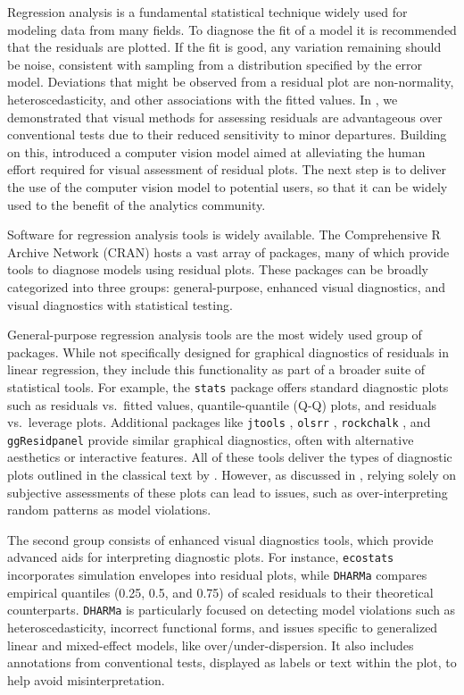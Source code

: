 \documentclass[
doublespace,
  times]{anzsauth}
\begin{document}
Regression analysis is a fundamental statistical technique widely used
for modeling data from many fields. To diagnose the fit of a model it is
recommended that the residuals are plotted. If the fit is good, any
variation remaining should be noise, consistent with sampling from a
distribution specified by the error model. Deviations that might be
observed from a residual plot are non-normality, heteroscedasticity, and
other associations with the fitted values. In \citet{li2024plot}, we
demonstrated that visual methods for assessing residuals are
advantageous over conventional tests due to their reduced sensitivity to
minor departures. Building on this, \citet{li2024automated} introduced a
computer vision model aimed at alleviating the human effort required for
visual assessment of residual plots. The next step is to deliver the use
of the computer vision model to potential users, so that it can be
widely used to the benefit of the analytics community.

Software for regression analysis tools is widely available. The
Comprehensive R Archive Network (CRAN) \citep{hornik2012comprehensive}
hosts a vast array of packages, many of which provide tools to diagnose
models using residual plots. These packages can be broadly categorized
into three groups: general-purpose, enhanced visual diagnostics, and
visual diagnostics with statistical testing.

General-purpose regression analysis tools are the most widely used group
of packages. While not specifically designed for graphical diagnostics
of residuals in linear regression, they include this functionality as
part of a broader suite of statistical tools. For example, the
\texttt{stats} package \citep{stats} offers standard diagnostic plots
such as residuals vs.~fitted values, quantile-quantile (Q-Q) plots, and
residuals vs.~leverage plots. Additional packages like \texttt{jtools}
\citep{jtools}, \texttt{olsrr} \citep{olsrr}, \texttt{rockchalk}
\citep{rockchalk}, and \texttt{ggResidpanel} \citep{ggresidpanel}
provide similar graphical diagnostics, often with alternative aesthetics
or interactive features. All of these tools deliver the types of
diagnostic plots outlined in the classical text by
\citet{cook1982residuals}. However, as discussed in \citet{li2024plot},
relying solely on subjective assessments of these plots can lead to
issues, such as over-interpreting random patterns as model violations.

The second group consists of enhanced visual diagnostics tools, which
provide advanced aids for interpreting diagnostic plots. For instance,
\texttt{ecostats} \citep{warton_global_2023} incorporates simulation
envelopes into residual plots, while \texttt{DHARMa} \citep{dharma}
compares empirical quantiles (0.25, 0.5, and 0.75) of scaled residuals
to their theoretical counterparts. \texttt{DHARMa} is particularly
focused on detecting model violations such as heteroscedasticity,
incorrect functional forms, and issues specific to generalized linear
and mixed-effect models, like over/under-dispersion. It also includes
annotations from conventional tests, displayed as labels or text within
the plot, to help avoid misinterpretation.
\end{document}
